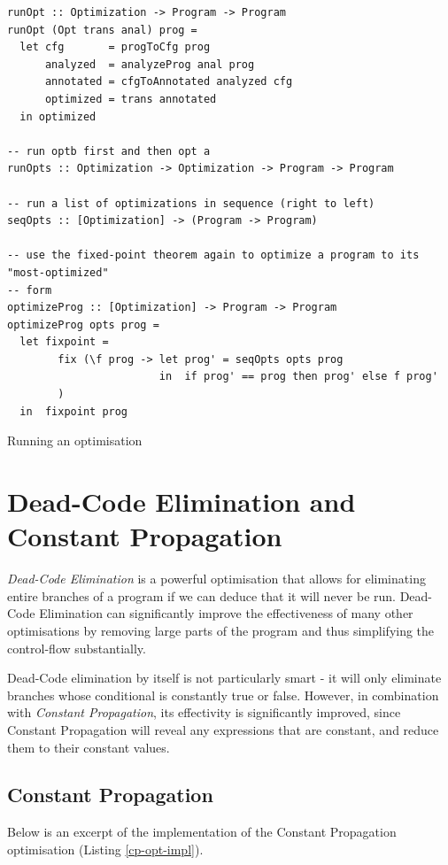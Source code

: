\documentclass{article}
\begin{document}
\begin{listing}[H]
\begin{verbatim}
runOpt :: Optimization -> Program -> Program
runOpt (Opt trans anal) prog =
  let cfg       = progToCfg prog
      analyzed  = analyzeProg anal prog
      annotated = cfgToAnnotated analyzed cfg
      optimized = trans annotated
  in optimized

-- run optb first and then opt a
runOpts :: Optimization -> Optimization -> Program -> Program

-- run a list of optimizations in sequence (right to left)
seqOpts :: [Optimization] -> (Program -> Program)

-- use the fixed-point theorem again to optimize a program to its "most-optimized"
-- form
optimizeProg :: [Optimization] -> Program -> Program
optimizeProg opts prog =
  let fixpoint =
        fix (\f prog -> let prog' = seqOpts opts prog
                        in  if prog' == prog then prog' else f prog'
        )
  in  fixpoint prog
\end{verbatim}
\caption{Running an optimisation}
\label{runopt}
\end{listing}

\section{Dead-Code Elimination and Constant
Propagation}\label{dead-code-elimination-and-constant-propagation}

\emph{Dead-Code Elimination} is a powerful optimisation that allows for
eliminating entire branches of a program if we can deduce that it will
never be run. Dead-Code Elimination can significantly improve the
effectiveness of many other optimisations by removing large parts of the
program and thus simplifying the control-flow substantially.

Dead-Code elimination by itself is not particularly smart - it will only
eliminate branches whose conditional is constantly true or false.
However, in combination with \emph{Constant Propagation}, its
effectivity is significantly improved, since Constant Propagation will
reveal any expressions that are constant, and reduce them to their
constant values.

\subsection{Constant Propagation}\label{constant-propagation-1}

Below is an excerpt of the implementation of the Constant Propagation
optimisation (Listing \ref{cp-opt-impl}).
\end{document}
